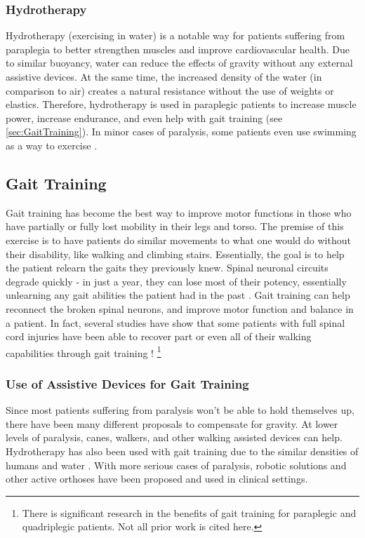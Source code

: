 \subsubsection{Hydrotherapy}
Hydrotherapy (exercising in water) is a notable way for patients suffering from paraplegia to better strengthen muscles and improve cardiovascular health. Due to similar buoyancy, water can reduce the effects of gravity without any external assistive devices. At the same time, the increased density of the water (in comparison to air) creates a natural resistance without the use of weights or elastics. Therefore, hydrotherapy is used in paraplegic patients to increase muscle power, increase endurance, and even help with gait training (see \autoref{sec:GaitTraining}). In minor cases of paralysis, some patients even use swimming as a way to exercise \cite{RehabParaplegia} \cite{BenefitsOfHydrotherapy}.

\subsection{Gait Training}
\label{sec:GaitTraining}

Gait training has become the best way to improve motor functions in those who have partially or fully lost mobility in their legs and torso. The premise of this exercise is to have patients do similar movements to what one would do without their disability, like walking and climbing stairs. Essentially, the goal is to help the patient relearn the gaits they previously knew. Spinal neuronal circuits degrade quickly - in just a year, they can lose most of their potency, essentially unlearning any gait abilities the patient had in the past \cite{GaitTrainingClinical} \cite{RehabParaplegia} \cite{TrunkMuscleLoadingParaplegia}. Gait training can help reconnect the broken spinal neurons, and improve motor function and balance in a patient. In fact, several studies have show that some patients with full spinal cord injuries have been able to recover part or even all of their walking capabilities through gait training \cite{GaitTrainingClinical} \cite{ImprovingGaitAdaptabilityInPatients}! 
\footnote{There is significant research in the benefits of gait training for paraplegic and quadriplegic patients. Not all prior work is cited here.} 

\subsubsection{Use of Assistive Devices for Gait Training}
Since most patients suffering from paralysis won't be able to hold themselves up, there have been many different proposals to compensate for gravity. At lower levels of paralysis, canes, walkers, and other walking assisted devices can help. Hydrotherapy has also been used with gait training due to the similar densities of humans and water \cite{BenefitsOfHydrotherapy}. With more serious cases of paralysis, robotic solutions and other active orthoses have been proposed and used in clinical settings.

